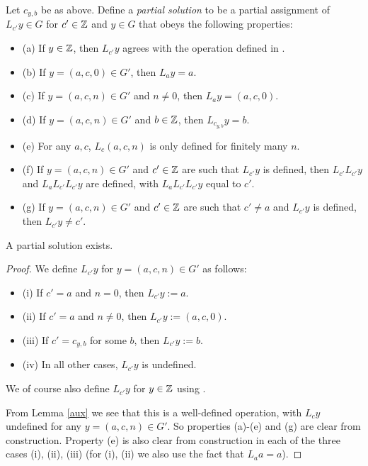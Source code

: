 Let $c_{y,b}$ be as above. Define a \emph{partial solution} to be a partial assignment of $L_{c'} y \in G$ for $c' \in \mathbb{Z}$ and $y \in G$ that obeys the following properties:
\begin{itemize}
\item (a) If $y \in \mathbb{Z}$, then $L_{c'} y$ agrees with the operation defined in .
\item (b) If $y = (a,c,0) \in G'$, then $L_a y = a$.
\item (c) If $y = (a,c,n) \in G'$ and $n \neq 0$, then $L_a y = (a,c,0)$.
\item (d) If $y = (a,c,n) \in G'$ and $b \in \mathbb{Z}$, then $L_{c_{y,b}} y = b$.
\item (e) For any $a,c$, $L_c (a,c,n)$ is only defined for finitely many $n$.
\item (f) If $y = (a,c,n) \in G'$ and $c' \in \mathbb{Z}$ are such that $L_{c'} y$ is defined, then $L_{c'} L_{c'} y$ and $L_a L_{c'} L_{c'} y$ are defined, with $L_a L_{c'} L_{c'} y$ equal to $c'$.
\item (g) If $y = (a,c,n) \in G'$ and $c' \in \mathbb{Z}$ are such that $c' \neq a$ and $L_{c'} y$ is defined, then $L_{c'} y \neq c'$.
\end{itemize}

\begin{lemma}\label{part-exist}  A partial solution exists.
\end{lemma}

\begin{proof}  We define $L_{c'} y$ for $y = (a,c,n) \in G'$ as follows:
\begin{itemize}
  \item (i) If $c' = a$ and $n=0$, then $L_{c'} y := a$.
  \item (ii) If $c' = a$ and $n \neq 0$, then $L_{c'} y := (a,c,0)$.
  \item (iii) If $c' = c_{y,b}$ for some $b$, then $L_{c'} y := b$.
  \item (iv) In all other cases, $L_{c'} y$ is undefined.
\end{itemize}
We of course also define $L_{c'} y$ for $y \in \mathbb{Z}$ using .

From Lemma \ref{aux} we see that this is a well-defined operation, with $L_c y$ undefined for any $y = (a,c,n) \in G'$.  So properties (a)-(e) and (g) are clear from construction.  Property (e) is also clear from construction in each of the three cases (i), (ii), (iii) (for (i), (ii) we also use the fact that $L_a a = a$).
\end{proof}

